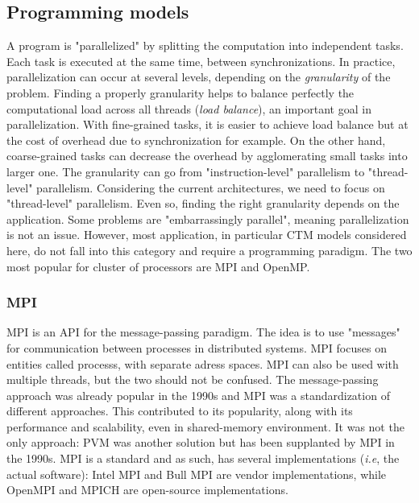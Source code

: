 \subsection{Programming models}
A program is "parallelized" by splitting the computation into independent tasks.
Each task is executed at the same time, between synchronizations. In practice,
parallelization can occur at several levels, depending on the
\textit{granularity} of the problem. Finding a properly granularity helps to
balance perfectly the computational load across all threads (\textit{load
balance}), an important goal in parallelization. With fine-grained tasks, it is
easier to achieve load balance but at the cost of \gls{overhead} due to
synchronization for example. On the other hand, coarse-grained tasks can decrease
the overhead by agglomerating small tasks into larger one. The granularity can
go from "instruction-level" parallelism to "thread-level" parallelism.
Considering the current architectures, we need to focus on "thread-level"
parallelism. Even so, finding the right granularity depends on the
application.
Some problems are "embarrassingly parallel", meaning parallelization is not an
issue. However, most application, in particular CTM models considered here, do
not fall into this category and require a programming paradigm. The two most
popular for cluster of processors are MPI and OpenMP.

\subsubsection{MPI}
\gls{MPI} is an \gls{API} for the message-passing paradigm. The
idea is to use "messages" for communication between processes in distributed
systems. MPI focuses on entities called \glspl{process}, with separate adress
spaces. MPI can also be used with multiple \glspl{thread}, but the two should
not be confused. The message-passing approach was already popular in the 1990s
and MPI was a standardization of different approaches. This contributed to its
popularity, along with its performance and scalability, even in shared-memory
environment.  It was not the only approach: \gls{PVM} was another solution but
has been supplanted by MPI in the 1990s. MPI is a standard and as such, has
several implementations (\textit{i.e}, the actual software): Intel MPI and Bull
MPI are vendor implementations, while OpenMPI and MPICH are open-source
implementations.

